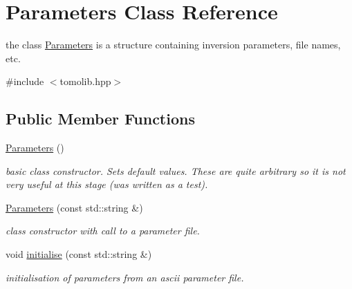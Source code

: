 \hypertarget{class_parameters}{}\section{Parameters Class Reference}
\label{class_parameters}


the class \hyperlink{class_parameters}{Parameters} is a structure containing inversion parameters, file names, etc.  




{\ttfamily \#include $<$tomolib.\+hpp$>$}

\subsection*{Public Member Functions}
\begin{DoxyCompactItemize}
\item 
\hypertarget{class_parameters_af4d94ee360ac0157d9065f78797fe9a1}{}\hyperlink{class_parameters_af4d94ee360ac0157d9065f78797fe9a1}{Parameters} ()\label{class_parameters_af4d94ee360ac0157d9065f78797fe9a1}

\begin{DoxyCompactList}\small\item\em basic class constructor. Sets default values. These are quite arbitrary so it is not very useful at this stage (was written as a test). \end{DoxyCompactList}\item 
\hypertarget{class_parameters_a1644cf009201db844a865c187ceddb78}{}\hyperlink{class_parameters_a1644cf009201db844a865c187ceddb78}{Parameters} (const std\+::string \&)\label{class_parameters_a1644cf009201db844a865c187ceddb78}

\begin{DoxyCompactList}\small\item\em class constructor with call to a parameter file. \end{DoxyCompactList}\item 
\hypertarget{class_parameters_a8844c0e0b7931802c29988b3eef1452d}{}void \hyperlink{class_parameters_a8844c0e0b7931802c29988b3eef1452d}{initialise} (const std\+::string \&)\label{class_parameters_a8844c0e0b7931802c29988b3eef1452d}

\begin{DoxyCompactList}\small\item\em initialisation of parameters from an ascii parameter file. \end{DoxyCompactList}\end{DoxyCompactItemize}
